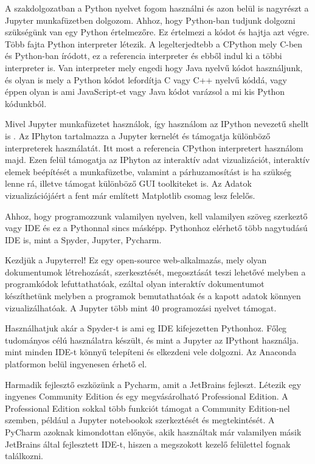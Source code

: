 
    A szakdolgozatban a Python nyelvet fogom használni és azon belül is
nagyrészt a Jupyter munkafüzetben dolgozom. Ahhoz, hogy Python-ban
tudjunk dolgozni szükségünk van egy Python értelmezőre. Ez értelmezi a
kódot és hajtja azt végre. Több fajta Python interpreter létezik. A
legelterjedtebb a CPython mely C-ben és Python-ban íródott, ez a
referencia interpreter és ebből indul ki a többi interpreter is. Van
interpreter mely engedi hogy Java nyelvű kódot használjunk, és olyan is
mely a Python kódot lefordítja C vagy C++ nyelvű kóddá, vagy éppen olyan
is ami JavaScript-et vagy Java kódot varázsol a mi kis Python kódunkból.

Mivel Jupyter munkafüzetet használok, így használom az IPython nevezetű
shellt is \cite{ipython}.
Az IPhyton tartalmazza a Jupyter kernelét és támogatja különböző
interpreterek használatát. Itt most a referencia CPython interpretert
használom majd. Ezen felül támogatja az IPhyton az interaktív adat
vizualizációt, interaktív elemek beépítését a munkafüzetbe, valamint a
párhuzamosítást is ha szükség lenne rá, illetve támogat különböző GUI
toolkiteket is. Az Adatok vizualizációjáért a fent már említett
Matplotlib csomag lesz felelős.

Ahhoz, hogy programozzunk valamilyen nyelven, kell valamilyen szöveg
szerkeztő vagy IDE és ez a Pythonnal sincs másképp. Pythonhoz elérhető
több nagytudású IDE is, mint a Spyder, Jupyter, Pycharm.

Kezdjük a Jupyterrel! Ez egy open-source web-alkalmazás, mely olyan
dokumentumok létrehozását, szerkesztését, megosztását teszi lehetővé
melyben a programkódok lefuttathatóak, ezáltal olyan interaktív
dokumentumot készíthetünk melyben a programok bemutathatóak és a kapott
adatok könnyen vizualizálhatóak. A Jupyter több mint 40 programozási
nyelvet támogat.

Használhatjuk akár a Spyder-t is ami eg IDE kifejezetten Pythonhoz.
Főleg tudományos célú használatra készült, és mint a Jupyter az IPythont
használja. mint minden IDE-t könnyű telepíteni és elkezdeni vele
dolgozni. Az Anaconda platformon belül ingyenesen érhető el.

Harmadik fejlesztő eszközünk a Pycharm, amit a JetBrains fejleszt.
Létezik egy ingyenes Community Edition és egy megvásárolható
Professional Edition. A Professional Edition sokkal több funkciót
támogat a Community Edition-nel szemben, például a Jupyter notebookok
szerkeztését és megtekintését. A PyCharm azoknak kimondottan előnyös,
akik használtak már valamilyen másik JetBrains által fejlesztett IDE-t,
hiszen a megszokott kezelő felülettel fognak találkozni.
